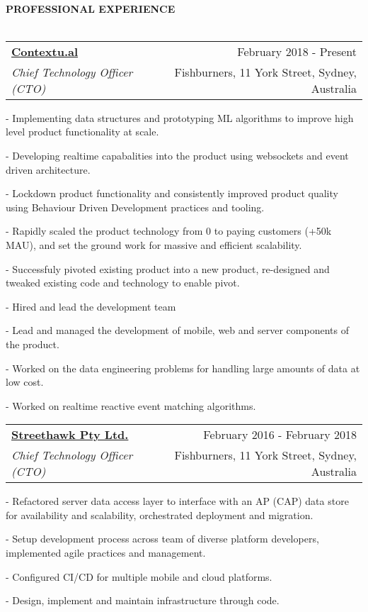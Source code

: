 \documentclass[10pt]{article}
\makeatletter
\newcommand{\lineunder}{\vspace*{-10pt} \\ \hspace*{-18pt} \hrulefill \vspace{2pt}\\}
\newcommand{\header}[1]{{\hspace*{-15pt}\vspace*{-0pt}\\ \uppercase{\textbf {#1}}}  \lineunder}
\newcommand{\employer}[4]{ 
        \vspace*{6pt}
	\begin{tabular*}{\textwidth}{l@{\extracolsep{\fill}}r}
	\textbf{#1} & #2 \\
                #3  & #4 \\ 
	\end{tabular*}
}
\newenvironment{achievements}{
        \vspace{-0pt}
        \begin{list}
        {}
        {\topsep 0pt \itemsep -3pt}
}
{
        \end{list}
}
\makeatother
\begin{document}
\vspace{15pt}
\header{Professional Experience}
\employer{\href{http://www.contextu.al/}{Contextu.al}}{February 2018 - Present}{\emph{Chief Technology Officer (CTO)}} {Fishburners, 11 York Street, Sydney, Australia}
	\begin{achievements}
      \item[-] Implementing data structures and prototyping ML algorithms to improve high level product functionality at scale.
      \item[-] Developing realtime capabalities into the product using websockets and event driven architecture.
      \item[-] Lockdown product functionality and consistently improved product quality using Behaviour Driven Development practices and tooling.
      \item[-] Rapidly scaled the product technology from 0 to paying customers (+50k MAU), and set the ground work for massive and efficient scalability. 
      \item[-] Successfuly pivoted existing product into a new product, re-designed and tweaked existing code and technology to enable pivot.
      \item[-] Hired and lead the development team
      \item[-] Lead and managed the development of mobile, web and server components of the product.
      \item[-] Worked on the data engineering problems for handling large amounts of data at low cost.
      \item[-] Worked on realtime reactive event matching algorithms.
    \end{achievements}

\employer{\href{http://www.streethawk.com/}{Streethawk Pty Ltd.}}{February 2016 - February 2018}{\emph{Chief Technology Officer (CTO)}} {Fishburners, 11 York Street, Sydney, Australia}
	\begin{achievements}
                \item[-] Refactored server data access layer to interface with an AP (CAP) data store for availability and scalability, orchestrated deployment and migration.
                \item[-] Setup development process across team of diverse platform developers, implemented agile practices and management.
                \item[-] Configured CI/CD for multiple mobile and cloud platforms.
                \item[-] Design, implement and maintain infrastructure through code.
    \end{achievements}
\end{document}
